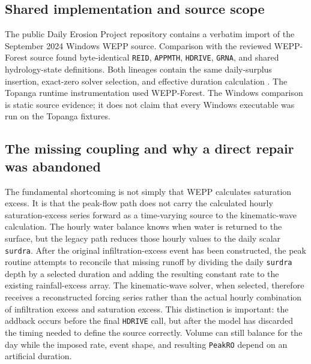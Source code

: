 \documentclass[11pt]{article}
\newcommand{\PeakRO}{\texttt{PeakRO}}
\newcommand{\surdra}{\texttt{surdra}}
\begin{document}
\subsection{Shared implementation and source scope}

The public Daily Erosion Project repository contains a verbatim import of the
September 2024 Windows WEPP source. Comparison with the reviewed WEPP-Forest
source found byte-identical \texttt{REID}, \texttt{APPMTH}, \texttt{HDRIVE},
\texttt{GRNA}, and shared hydrology-state definitions. Both lineages contain
the same daily-surplus insertion, exact-zero solver selection, and effective
duration calculation \cite{stakeholder}. The Topanga runtime instrumentation
used WEPP-Forest. The Windows comparison is static source evidence; it does not
claim that every Windows executable was run on the Topanga fixtures.

\subsection{The missing coupling and why a direct repair was abandoned}

The fundamental shortcoming is not simply that WEPP calculates saturation
excess. It is that the peak-flow path does not carry the calculated hourly
saturation-excess series forward as a time-varying source to the kinematic-wave
calculation. The hourly water balance knows when water is returned to the
surface, but the legacy path reduces those hourly values to the daily scalar
\surdra{}. After the original infiltration-excess event has been constructed,
the peak routine attempts to reconcile that missing runoff by dividing the
daily \surdra{} depth by a selected duration and adding the resulting constant
rate to the existing rainfall-excess array. The kinematic-wave solver, when
selected, therefore receives a reconstructed forcing series rather than the
actual hourly combination of infiltration excess and saturation excess. This
distinction is important: the addback occurs before the final \texttt{HDRIVE}
call, but after the model has discarded the timing needed to define the source
correctly. Volume can still balance for the day while the imposed rate, event
shape, and resulting \PeakRO{} depend on an artificial duration.
\end{document}
